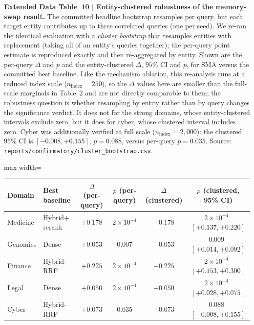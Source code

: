 \documentclass[pdflatex,sn-nature]{sn-jnl}
\newcommand{\edcaption}[1]{\par{\small #1}\par\smallskip}
\begin{document}
\begin{appendices}
\begin{table}[htbp]
\centering
\edcaption{\textbf{Extended Data Table~10 $|$ Entity-clustered robustness of the
    memory-swap result.}
  The committed headline bootstrap resamples per query, but each target entity
  contributes up to three correlated queries (one per seed). We re-ran the
  identical evaluation with a \emph{cluster bootstrap} that resamples entities with
  replacement (taking all of an entity's queries together); the per-query point
  estimate is reproduced exactly and then re-aggregated by entity. Shown are the
  per-query $\Delta$ and $p$ and the entity-clustered $\Delta$, $95\%$ CI and $p$,
  for SMA versus the committed best baseline. Like the mechanism ablation, this
  re-analysis runs at a reduced index scale ($n_\text{index}{=}250$), so the
  $\Delta$ values here are smaller than the full-scale marginals in Table~2 and are
  not directly comparable to them; the robustness question is whether resampling by
  entity rather than by query changes the significance verdict. It does not for the
  strong domains, whose entity-clustered intervals exclude zero, but it does for
  cyber, whose clustered interval includes zero. Cyber was additionally verified at
  full scale ($n_\text{index}{=}2{,}000$): the clustered $95\%$ CI is
  $[-0.008,+0.155]$, $p{=}0.088$, versus per-query $p{=}0.035$.
  Source: \texttt{reports/confirmatory/cluster\_bootstrap.csv}.}
\small
\setlength{\tabcolsep}{6pt}
\begin{adjustbox}{max width=\textwidth}
\begin{tabular}{llcccc}
\toprule
\textbf{Domain} & \textbf{Best baseline} & \textbf{$\Delta$ (per-query)} &
    \textbf{$p$ (per-query)} & \textbf{$\Delta$ (clustered)} &
    \textbf{$p$ (clustered, 95\% CI)} \\
\midrule
Medicine & Hybrid$+$rerank & $+0.178$ & $2{\times}10^{-4}$ & $+0.178$ & $2{\times}10^{-4}$ \,$[+0.137,+0.220]$ \\
Genomics & Dense        & $+0.053$ & $0.007$           & $+0.053$ & $0.009$ \,$[+0.014,+0.092]$ \\
Finance  & Hybrid-RRF    & $+0.225$ & $2{\times}10^{-4}$ & $+0.225$ & $2{\times}10^{-4}$ \,$[+0.153,+0.300]$ \\
Legal    & Dense         & $+0.050$ & $2{\times}10^{-4}$ & $+0.050$ & $2{\times}10^{-4}$ \,$[+0.028,+0.075]$ \\
\rowcolor{smarow}Cyber & Hybrid-RRF & $+0.073$ & $0.035$ & $+0.073$ & $0.088$ \,$[-0.008,+0.155]$ \\
\bottomrule
\end{tabular}
\end{adjustbox}
\label{tab:ed10_cluster}
\end{table}



\end{appendices}
\end{document}
